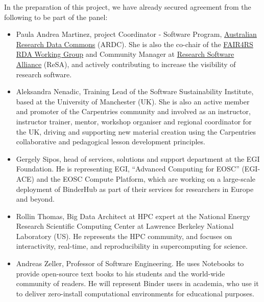 In the preparation of this project, we have already secured agreement from the
following to be part of the panel:
\begin{itemize}
\item Paula Andrea Martinez, project Coordinator - Software Program, \href{https://ardc.edu.au/}{Australian Research Data Commons} (ARDC).
She is also the co-chair of the \href{https://www.rd-alliance.org/groups/fair-research-software-fair4rs-wg}{FAIR4RS RDA Working Group} and
Community Manager  at \href{https://www.researchsoft.org/}{Research Software Alliance} (ReSA), and actively contributing
to increase the visibility of research software.
\item Aleksandra Nenadic, Training Lead of the Software Sustainability Institute, 
based at the University of Manchester (UK). She is also an active member and 
promoter of the Carpentries community and involved as an instructor, 
instructor trainer, mentor, workshop organiser and regional coordinator 
for the UK, driving and supporting new material creation using the 
Carpentries collaborative and pedagogical lesson development principles.
\item Gergely Sipos, head of services, solutions and support department at the
  EGI Foundation. He is representing EGI, ``Advanced Computing for EOSC''
  (EGI-ACE) and the EOSC Compute Platform, which are working on a large-scale
  deployment of BinderHub as part of their services for researchers in Europe
  and beyond.
\item Rollin Thomas, Big Data Architect at HPC expert at the National Energy
  Research Scientific Computing Center at Lawrence Berkeley National Laboratory
  (US). He represents the HPC community, and focuses on interactivity,
  real-time, and reproducibility in supercomputing for science.
\item Andreas Zeller, Professor of Software Engineering. He uses Notebooks 
  to provide open-source text books to his students and the world-wide
  community of readers. He will represent Binder users in academia, who use it 
  to deliver zero-install computational environments for educational
  purposes.
\end{itemize}